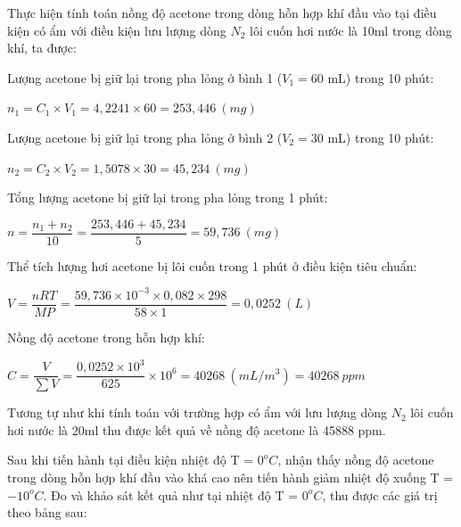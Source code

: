\documentclass{article} %
\begin{document}

Thực hiện tính toán nồng độ acetone trong dòng hỗn hợp khí đầu vào tại điều kiện có ẩm với điều kiện lưu lượng dòng $N_2$ lôi cuốn hơi nước là 10ml trong dòng khí, ta được: 

Lượng acetone bị giữ lại trong pha lỏng ở bình 1 ($V_1 = 60$ mL) trong 10 phút:

\begin{center}
    $n_1 = C_1 \times V_1 = 4,2241 \times 60 = 253,446 \ (mg)$
\end{center}

Lượng acetone bị giữ lại trong pha lỏng ở bình 2 ($V_2 = 30$ mL) trong 10 phút:

\begin{center}
    $n_2 = C_2 \times V_2 = 1,5078 \times 30 = 45,234 \ (mg)$
\end{center}

Tổng lượng acetone bị giữ lại trong pha lỏng trong 1 phút:

\begin{center}
    $n = \dfrac{n_1 + n_2}{10} = \dfrac{253,446 + 45,234}{5} = 59,736 \ (mg)$
\end{center}

Thể tích lượng hơi acetone bị lôi cuốn trong 1 phút ở điều kiện tiêu chuẩn:

\begin{center}
    $V = \dfrac{nRT}{MP} = \dfrac{59,736 \times 10^{-3} \times 0,082 \times 298}{58 \times 1} = 0,0252 \ (L)$
\end{center}

Nồng độ acetone trong hỗn hợp khí:

\begin{center}
    $C = \dfrac{V}{\sum V} = \dfrac{0,0252 \times 10^3}{625} \times 10^6 = 40268 \ (mL/m^3) = 40268 \ ppm$
\end{center}%


Tương tự như khi tính toán với trường hợp có ẩm với lưu lượng dòng $N_2$ lôi cuốn hơi nước là 20ml thu được kết quả về nồng độ acetone là 45888 ppm.

Sau khi tiến hành tại điều kiện nhiệt độ T = $0^oC$, nhận thấy nồng độ acetone trong dòng hỗn hợp khí đầu vào khá cao nên tiến hành giảm nhiệt độ xuống T = $-10^oC$. Đo và khảo sát kết quả như tại nhiệt độ T = $0^oC$, thu được các giá trị theo bảng sau:
\end{document}
